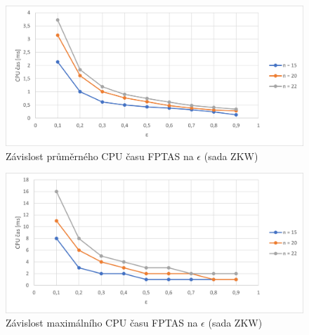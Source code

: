 \documentclass[12pt]{article}
\begin{document}
\begin{figure}[ht]\centering
    \includegraphics[width=1\textwidth, keepaspectratio]{graphs/ZKW/fptas/zkw_fptas_time_eps_avg.png}
    \caption{Závislost průměrného CPU času FPTAS na $\epsilon$ (sada ZKW)}
    \label{fig:zkw_fptas_eps_time_avg}
\end{figure}

\begin{figure}[ht]\centering
    \includegraphics[width=1\textwidth, keepaspectratio]{graphs/ZKW/fptas/zkw_fptas_time_eps_max.png}
    \caption{Závislost maximálního CPU času FPTAS na $\epsilon$ (sada ZKW)}
    \label{fig:zkw_fptas_eps_time_max}
\end{figure}
\end{document}
